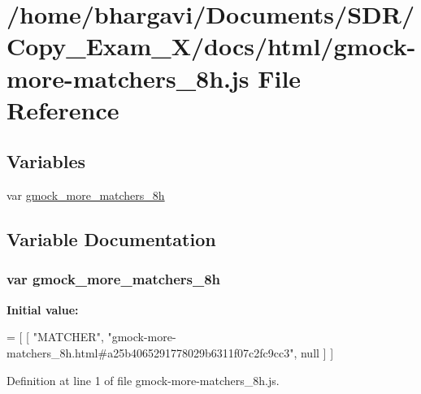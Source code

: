 \hypertarget{gmock-more-matchers__8h_8js}{}\section{/home/bhargavi/\+Documents/\+S\+D\+R/\+Copy\+\_\+\+Exam\+\_\+X/docs/html/gmock-\/more-\/matchers\+\_\+8h.js File Reference}
\label{gmock-more-matchers__8h_8js}
\subsection*{Variables}
\begin{DoxyCompactItemize}
\item 
var \hyperlink{gmock-more-matchers__8h_8js_a17044c5c8deed82abb414ace27b75de5}{gmock\+\_\+more\+\_\+matchers\+\_\+8h}
\end{DoxyCompactItemize}


\subsection{Variable Documentation}
\subsubsection[{\texorpdfstring{gmock\+\_\+more\+\_\+matchers\+\_\+8h}{gmock_more_matchers_8h}}]{\setlength{\rightskip}{0pt plus 5cm}var gmock\+\_\+more\+\_\+matchers\+\_\+8h}\hypertarget{gmock-more-matchers__8h_8js_a17044c5c8deed82abb414ace27b75de5}{}\label{gmock-more-matchers__8h_8js_a17044c5c8deed82abb414ace27b75de5}
{\bfseries Initial value\+:}
\begin{DoxyCode}
=
[
    [ \textcolor{stringliteral}{"MATCHER"}, \textcolor{stringliteral}{"gmock-more-matchers\_8h.html#a25b4065291778029b6311f07c2fc9cc3"}, null ]
]
\end{DoxyCode}


Definition at line 1 of file gmock-\/more-\/matchers\+\_\+8h.\+js.


